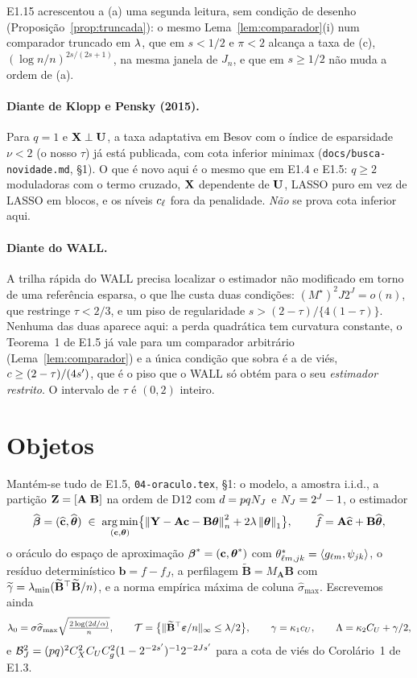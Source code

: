 \documentclass[11pt,a4paper]{article}
\newcommand{\lmin}{\lambda_{\min}}
\newcommand{\Amat}{\mathbf{A}}
\newcommand{\Bmat}{\mathbf{B}}
\newcommand{\Btil}{\widetilde{\Bmat}}
\newcommand{\MA}{M_{\Amat}}
\newcommand{\bbeta}{\boldsymbol{\beta}}
\newcommand{\betahat}{\widehat{\bbeta}}
\newcommand{\betastar}{\bbeta^{*}}
\newcommand{\bveps}{\boldsymbol{\varepsilon}}
\newcommand{\bb}{\mathbf{b}}
\newcommand{\bY}{\mathbf{Y}}
\newcommand{\smax}{\widehat{\sigma}_{\max}}
\newcommand{\gtil}{\widetilde{\gamma}}
\newcommand{\Mstar}{M^{\star}}
\begin{document}
E1.15 acrescentou a (a) uma segunda leitura, sem condição de desenho
(Proposição~\ref{prop:truncada}): o mesmo Lema~\ref{lem:comparador}(i) num
comparador truncado em $\lambda$, que em $s < 1/2$ e $\pi < 2$ alcança a taxa de
(c), $(\log n/n)^{2s/(2s+1)}$, na mesma janela de $J_{n}$, e que em
$s \ge 1/2$ não muda a ordem de (a).

\paragraph{Diante de Klopp e Pensky (2015).} Para $q = 1$ e
$\mathbf{X} \perp \mathbf{U}$, a taxa adaptativa em Besov com o índice de esparsidade
$\nu < 2$ (o nosso $\tau$) já está publicada, com cota inferior minimax
(\texttt{docs/busca-novidade.md}, §1). O que é novo aqui é o mesmo que em
E1.4 e E1.5: $q \ge 2$ moduladoras com o termo cruzado, $\mathbf{X}$ dependente de
$\mathbf{U}$, LASSO puro em vez de LASSO em blocos, e os níveis $c_{\ell}$ fora da
penalidade. \emph{Não} se prova cota inferior aqui.

\paragraph{Diante do WALL.} A trilha rápida do WALL precisa localizar o
estimador não modificado em torno de uma referência esparsa, o que lhe custa
duas condições: $(\Mstar)^{2}J2^{J} = o(n)$, que restringe $\tau < 2/3$, e um
piso de regularidade $s > (2-\tau)/\{4(1-\tau)\}$. Nenhuma das duas aparece
aqui: a perda quadrática tem curvatura constante, o Teorema~1 de E1.5 já vale
para um comparador arbitrário (Lema~\ref{lem:comparador}) e a única condição
que sobra é a de viés, $c \ge (2-\tau)/(4s')$, que é o piso que o WALL só
obtém para o seu \emph{estimador restrito}. O intervalo de $\tau$ é
$(0,2)$ inteiro.

\section{Objetos}

Mantém-se tudo de E1.5, \texttt{04-oraculo.tex}, §1: o modelo, a amostra
i.i.d., a partição $\bZ = [\Amat\;\Bmat]$ na ordem de D12 com
$d = pqN_{J}$ e $N_{J} = 2^{J}-1$, o estimador
\[
  \betahat = (\chat, \thetahat)
  \;\in\; \operatorname*{arg\,min}_{(\bc,\btheta)}
  \bigl\{ \normn{\bY - \Amat\bc - \Bmat\btheta}^{2} + 2\pen\norm{\btheta}_{1}\bigr\},
  \qquad \widehat{f} = \Amat\chat + \Bmat\thetahat,
\]
o oráculo do espaço de aproximação $\betastar = (\bc,\thetastar)$ com
$\theta^{*}_{\ell m,jk} = \langle g_{\ell m}, \psi_{jk} \rangle$, o
resíduo determinístico $\bb = f - f_{J}$, a perfilagem
$\Btil = \MA\Bmat$ com $\gtil = \lmin(\Btil\T\Btil/n)$, e a norma empírica
máxima de coluna $\smax$. Escrevemos ainda
\[
  \pen_{0} = \sigma\smax\sqrt{\tfrac{2\log(2d/\alpha)}{n}},
  \qquad
  \mathcal{T} = \bigl\{\lVert\Btil\T\bveps/n\rVert_{\infty} \le \pen/2\bigr\},
  \qquad
  \gamma = \kappa_{1}c_{U},
  \qquad
  \Lambda = \kappa_{2}C_{U} + \gamma/2 ,
\]
e $\mathcal{B}_{J}^{2} = (pq)^{2}C_{X}^{2}C_{U}C_{g}^{2}(1-2^{-2s'})^{-1}
2^{-2Js'}$ para a cota de viés do Corolário~1 de E1.3.
\end{document}
